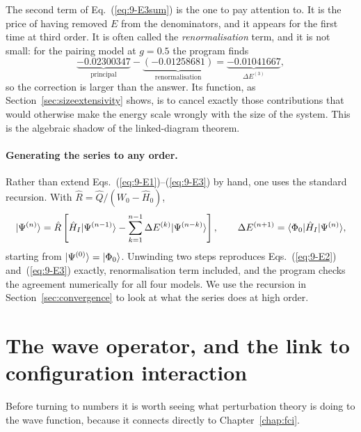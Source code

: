 The second term of Eq.~(\ref{eq:9-E3sum}) is the one to pay attention to.  It
is the price of having removed $E$ from the denominators, and it appears for
the first time at third order.  It is often called the \emph{renormalisation}
term, and it is not small: for the pairing model at $g=0.5$ the program finds
\begin{equation}
  \underbrace{-0.02300347}_{\text{principal}}
  - \underbrace{\left(-0.01258681\right)}_{\text{renormalisation}}
  = \underbrace{-0.01041667}_{\Delta E^{(3)}},
  \label{eq:9-renormexample}
\end{equation}
so the correction is larger than the answer.  Its function, as
Section~\ref{sec:sizeextensivity} shows, is to cancel exactly those
contributions that would otherwise make the energy scale wrongly with the
size of the system.  This is the algebraic shadow of the linked-diagram
theorem.

\paragraph{Generating the series to any order.}
Rather than extend Eqs.~(\ref{eq:9-E1})--(\ref{eq:9-E3}) by hand, one uses the
standard recursion.  With $\hat{R}=\hat{Q}/(W_0-\hat{H}_0)$,
\begin{equation}
  \vert \Psi^{(n)} \rangle = \hat{R}\left[\hat{H}_I\vert \Psi^{(n-1)} \rangle
    - \sum_{k=1}^{n-1}\Delta E^{(k)}\vert \Psi^{(n-k)} \rangle\right],
  \qquad
  \Delta E^{(n+1)} = \langle \Phi_0 | \hat{H}_I | \Psi^{(n)} \rangle,
  \label{eq:9-recursion}
\end{equation}
starting from $\vert \Psi^{(0)} \rangle=\vert \Phi_0 \rangle$.  Unwinding two steps
reproduces Eqs.~(\ref{eq:9-E2}) and~(\ref{eq:9-E3}) exactly, renormalisation
term included, and the program checks the agreement numerically for all four
models.  We use the recursion in Section~\ref{sec:convergence} to look at what
the series does at high order.

\section{The wave operator, and the link to configuration interaction}
\label{sec:waveoperator}

Before turning to numbers it is worth seeing what perturbation theory is
doing to the wave function, because it connects directly to
Chapter~\ref{chap:fci}.

